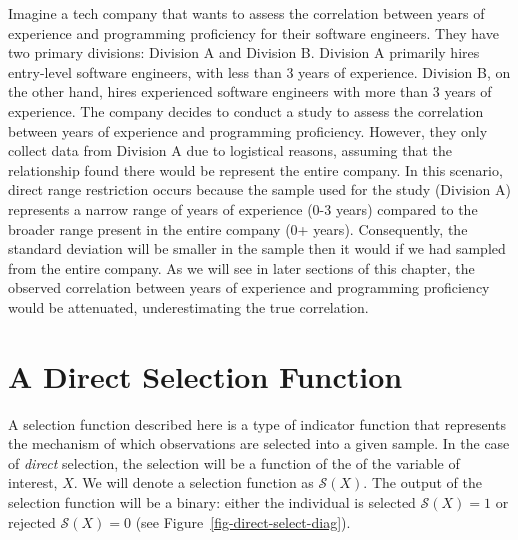 \documentclass[
  letterpaper,
  DIV=11,
  numbers=noendperiod]{scrreprt}
\begin{document}
Imagine a tech company that wants to assess the correlation between
years of experience and programming proficiency for their software
engineers. They have two primary divisions: Division A and Division B.
Division A primarily hires entry-level software engineers, with less
than 3 years of experience. Division B, on the other hand, hires
experienced software engineers with more than 3 years of experience. The
company decides to conduct a study to assess the correlation between
years of experience and programming proficiency. However, they only
collect data from Division A due to logistical reasons, assuming that
the relationship found there would be represent the entire company. In
this scenario, direct range restriction occurs because the sample used
for the study (Division A) represents a narrow range of years of
experience (0-3 years) compared to the broader range present in the
entire company (0+ years). Consequently, the standard deviation will be
smaller in the sample then it would if we had sampled from the entire
company. As we will see in later sections of this chapter, the observed
correlation between years of experience and programming proficiency
would be attenuated, underestimating the true correlation.

\hypertarget{a-direct-selection-function}{%
\section{A Direct Selection
Function}\label{a-direct-selection-function}}

A selection function described here is a type of indicator function that
represents the mechanism of which observations are selected into a given
sample. In the case of \emph{direct} selection, the selection will be a
function of the of the variable of interest, \(X\). We will denote a
selection function as \(\mathcal{S}(X)\). The output of the selection
function will be a binary: either the individual is selected
\(\mathcal{S}(X)=1\) or rejected \(\mathcal{S}(X)=0\) (see
Figure~\ref{fig-direct-select-diag}).
\end{document}
